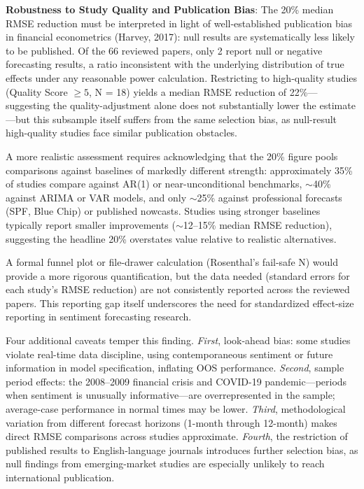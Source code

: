 \documentclass[11pt,twocolumn]{article}
\begin{document}
\textbf{Robustness to Study Quality and Publication Bias}: The 20\% median RMSE reduction must be interpreted in light of well-established publication bias in financial econometrics (Harvey, 2017): null results are systematically less likely to be published. Of the 66 reviewed papers, only 2 report null or negative forecasting results, a ratio inconsistent with the underlying distribution of true effects under any reasonable power calculation. Restricting to high-quality studies (Quality Score $\geq 5$, N = 18) yields a median RMSE reduction of 22\%---suggesting the quality-adjustment alone does not substantially lower the estimate---but this subsample itself suffers from the same selection bias, as null-result high-quality studies face similar publication obstacles.

A more realistic assessment requires acknowledging that the 20\% figure pools comparisons against baselines of markedly different strength: approximately 35\% of studies compare against AR(1) or near-unconditional benchmarks, $\sim$40\% against ARIMA or VAR models, and only $\sim$25\% against professional forecasts (SPF, Blue Chip) or published nowcasts. Studies using stronger baselines typically report smaller improvements ($\sim$12--15\% median RMSE reduction), suggesting the headline 20\% overstates value relative to realistic alternatives.

A formal funnel plot or file-drawer calculation (Rosenthal's fail-safe N) would provide a more rigorous quantification, but the data needed (standard errors for each study's RMSE reduction) are not consistently reported across the reviewed papers. This reporting gap itself underscores the need for standardized effect-size reporting in sentiment forecasting research.

Four additional caveats temper this finding. \emph{First}, look-ahead bias: some studies violate real-time data discipline, using contemporaneous sentiment or future information in model specification, inflating OOS performance. \emph{Second}, sample period effects: the 2008--2009 financial crisis and COVID-19 pandemic---periods when sentiment is unusually informative---are overrepresented in the sample; average-case performance in normal times may be lower. \emph{Third}, methodological variation from different forecast horizons (1-month through 12-month) makes direct RMSE comparisons across studies approximate. \emph{Fourth}, the restriction of published results to English-language journals introduces further selection bias, as null findings from emerging-market studies are especially unlikely to reach international publication.
\end{document}
